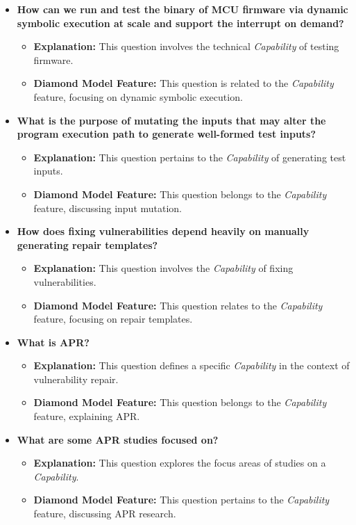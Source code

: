 \documentclass{article}
\begin{document}
\begin{itemize}
    \item \textbf{How can we run and test the binary of MCU firmware via dynamic symbolic execution at scale and support the interrupt on demand?}
    \begin{itemize}
        \item \textbf{Explanation:} This question involves the technical \textit{Capability} of testing firmware.
        \item \textbf{Diamond Model Feature:} This question is related to the \textit{Capability} feature, focusing on dynamic symbolic execution.
    \end{itemize}

    \item \textbf{What is the purpose of mutating the inputs that may alter the program execution path to generate well-formed test inputs?}
    \begin{itemize}
        \item \textbf{Explanation:} This question pertains to the \textit{Capability} of generating test inputs.
        \item \textbf{Diamond Model Feature:} This question belongs to the \textit{Capability} feature, discussing input mutation.
    \end{itemize}

    \item \textbf{How does fixing vulnerabilities depend heavily on manually generating repair templates?}
    \begin{itemize}
        \item \textbf{Explanation:} This question involves the \textit{Capability} of fixing vulnerabilities.
        \item \textbf{Diamond Model Feature:} This question relates to the \textit{Capability} feature, focusing on repair templates.
    \end{itemize}

    \item \textbf{What is APR?}
    \begin{itemize}
        \item \textbf{Explanation:} This question defines a specific \textit{Capability} in the context of vulnerability repair.
        \item \textbf{Diamond Model Feature:} This question belongs to the \textit{Capability} feature, explaining APR.
    \end{itemize}

    \item \textbf{What are some APR studies focused on?}
    \begin{itemize}
        \item \textbf{Explanation:} This question explores the focus areas of studies on a \textit{Capability}.
        \item \textbf{Diamond Model Feature:} This question pertains to the \textit{Capability} feature, discussing APR research.
    \end{itemize}


\end{itemize}
\end{document}
